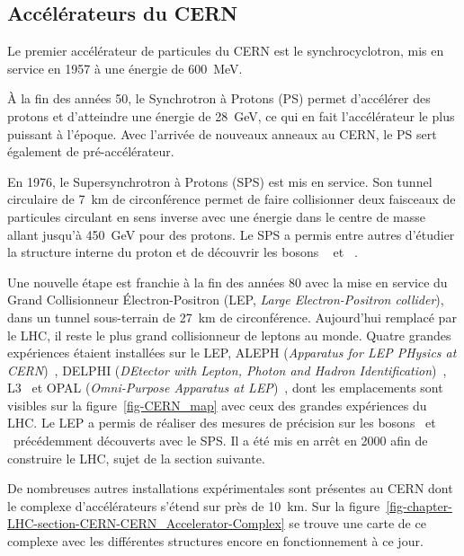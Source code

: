 \subsection{Accélérateurs du CERN}
Le premier accélérateur de particules du CERN est le synchrocyclotron, mis en service en 1957 à une énergie de \SI{600}{\MeV}.
\par À la fin des années 50, le Synchrotron à Protons (PS) permet d'accélérer des protons et d'atteindre une énergie de \SI{28}{\GeV}, ce qui en fait l'accélérateur le plus puissant à l'époque.
Avec l'arrivée de nouveaux anneaux au CERN, le PS sert également de pré-accélérateur.
\par En 1976, le Supersynchrotron à Protons (SPS) est mis en service.
Son tunnel circulaire de \SI{7}{\kilo\meter} de circonférence permet de faire collisionner deux faisceaux de particules circulant en sens inverse avec une énergie dans le centre de masse allant jusqu'à \SI{450}{\GeV} pour des protons.
Le SPS a permis entre autres d'étudier la structure interne du proton et de découvrir les bosons
\Wboson~\cite{Wboson_discovery1,Wboson_discovery2,Wboson_discovery3}
et
\Zboson~\cite{Zboson_discovery1,Zboson_discovery2}.
\par Une nouvelle étape est franchie à la fin des années 80 avec la mise en service du Grand Collisionneur Électron-Positron (LEP, \emph{Large Electron-Positron collider}), dans un tunnel sous-terrain de \SI{27}{\kilo\meter} de circonférence.
Aujourd’hui remplacé par le LHC, il reste le plus grand collisionneur de leptons au monde.
Quatre grandes expériences étaient installées sur le LEP,
ALEPH (\emph{Apparatus for LEP PHysics at CERN})~\cite{aleph_paper},
DELPHI (\emph{DEtector with Lepton, Photon and Hadron Identification})~\cite{delphi_paper},
L3~\cite{l3_paper} et
OPAL (\emph{Omni-Purpose Apparatus at LEP})~\cite{opal_paper},
dont les emplacements sont visibles sur la figure~\ref{fig-CERN_map} avec ceux des grandes expériences du LHC.
Le LEP a permis de réaliser des mesures de précision sur les bosons \Wboson\ et \Zboson\ précédemment découverts avec le SPS.
Il a été mis en arrêt en 2000 afin de construire le LHC, sujet de la section suivante.
\par De nombreuses autres installations expérimentales sont présentes au CERN dont le complexe d'accélérateurs s'étend sur près de \SI{10}{\kilo\meter}.
Sur la figure~\ref{fig-chapter-LHC-section-CERN-CERN_Accelerator-Complex} se trouve une carte de ce complexe avec les différentes structures encore en fonctionnement à ce jour.
